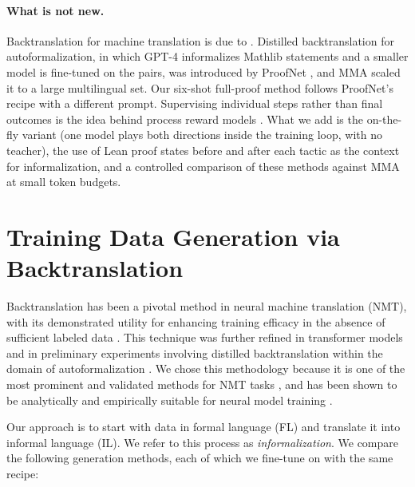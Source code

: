 \documentclass{article} %
\begin{document}
\paragraph{What is not new.} Backtranslation for machine translation is due to \citet{sennrich-etal-2016-improving}. Distilled backtranslation for autoformalization, in which GPT-4 informalizes Mathlib statements and a smaller model is fine-tuned on the pairs, was introduced by ProofNet \citep{azerbayev2023proofnet}, and MMA \citep{mma} scaled it to a large multilingual set. Our six-shot full-proof method follows ProofNet's recipe with a different prompt. Supervising individual steps rather than final outcomes is the idea behind process reward models \citep{lightman2023lets,uesato2022solving}. What we add is the on-the-fly variant (one model plays both directions inside the training loop, with no teacher), the use of Lean proof states before and after each tactic as the context for informalization, and a controlled comparison of these methods against MMA at small token budgets.

\section{Training Data Generation via Backtranslation}

Backtranslation has been a pivotal method in neural machine translation (NMT), with its demonstrated utility for enhancing training efficacy in the absence of sufficient labeled data \citep{poncelas2018investigating}. This technique was further refined in transformer models \citep{han2021unsupervised} and in preliminary experiments involving distilled backtranslation within the domain of autoformalization \citep{azerbayev2023proofnet}. We chose this methodology because it is one of the most prominent and validated methods for NMT tasks \citep{liu2021complementarity}, and has been shown to be analytically and empirically suitable for neural model training \citep{mma}.


Our approach is to start with data in formal language (FL) and translate it into informal language (IL). We refer to this process as {\em informalization}. We compare the following generation methods, each of which we fine-tune on with the same recipe:
\end{document}
